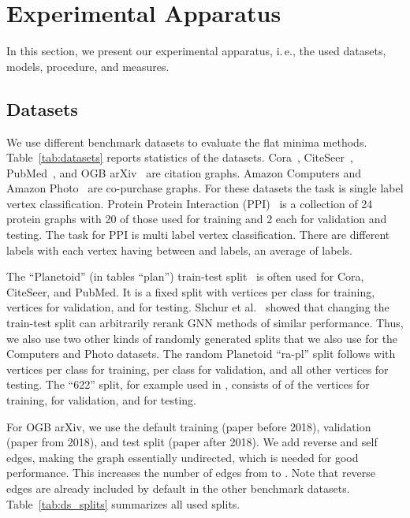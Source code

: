 \documentclass[runningheads]{llncs}
\newcommand{\ie}{i.\,e.,\xspace}
\begin{document}
\section{Experimental Apparatus}
\label{sec:expap}
In this section, we present our experimental apparatus, \ie the used datasets, models, procedure, and measures.

\subsection{Datasets}
\label{sec:ds}

We use different benchmark datasets to evaluate the flat minima methods.
Table~\ref{tab:datasets} reports statistics of the datasets.
Cora~\cite{CoraCiteseer}, CiteSeer~\cite{CoraCiteseer}, PubMed~\cite{pubmed}, and OGB arXiv~\cite{ogb} are citation graphs. 
Amazon Computers and Amazon Photo~\cite{Shchur18pitfalls} are co-purchase graphs.
For these datasets the task is single label vertex classification.
Protein Protein Interaction (PPI)~\cite{PPI} is a collection of 24 protein graphs with 20 of those used for training and 2 each for validation and testing.
The task for PPI is multi label vertex classification.
There are  different labels with each vertex having between  and  labels, an average of  labels.


The ``Planetoid'' (in tables ``plan'') train-test split~\cite{planetoid16Yang} is often used for Cora, CiteSeer, and PubMed.
It is a fixed split with  vertices per class for training,  vertices for validation, and  for testing.
Shchur et al.~\cite{Shchur18pitfalls} showed that changing the train-test split can arbitrarily rerank GNN methods of similar performance.
Thus, we also use two other kinds of randomly generated splits that we also use for the Computers and Photo datasets.
The random Planetoid ``ra-pl'' split follows \cite{Shchur18pitfalls} with  vertices per class for training,  per class for validation, and all other vertices for testing.
The ``622'' split, for example used in \cite{gcnII}, consists of  of the vertices for training,  for validation, and  for testing.

For OGB arXiv, we use the default training (paper before 2018), validation (paper from 2018), and test split (paper after 2018).
We add reverse and self edges, making the graph essentially undirected, which is needed for good performance.
This increases the number of edges from  to .
Note that reverse edges are already included by default in the other benchmark datasets.
Table~\ref{tab:ds_splits} summarizes all used splits.
\end{document}
